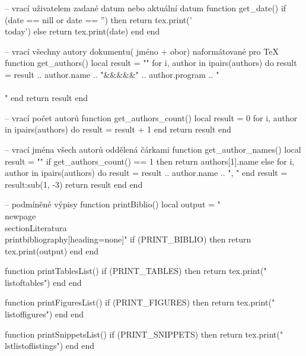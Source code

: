 \usepackage[
    a4paper,
    width=150mm,
    top=25mm,
    bottom=25mm
]{geometry}


\usepackage{fontspec}
\setmainfont{Linux Libertine O}


\usepackage[czech]{babel}


\usepackage{luacode}
\newcommand{\luavar}[1]{\directlua{tex.sprint(#1)}}
\begin{luacode*}
-- vrací uživatelem zadané datum nebo aktuální datum
function get_date()
  if (date == nill or date == '') then
    return tex.print('\\today')
  else
    return tex.print(date)
  end
end

-- vrací všechny autory dokumentu( jméno + obor) naformátované pro TeX
function get_authors()
  local result = ""
  for i, author in ipairs(authors) do
    result = result .. author.name .. "&&&&&" .. author.program .. "\\\\"
  end
  return result
end

-- vrací počet autorů
function get_authors_count()
    local result = 0
    for i, author in ipairs(authors) do
        result = result + 1
    end
    return result
end

-- vrací jména všech autorů oddělená čárkami
function get_author_names()
    local result = ""
    if get_authors_count() == 1 then
        return authors[1].name
    else
        for i, author in ipairs(authors) do
            result = result .. author.name .. ", "
        end
        result = result:sub(1, -3)
        return result
    end
end

-- podmíněné výpisy
function printBiblio()
  local output = "\\newpage \\section{Literatura} \\printbibliography[heading=none]"
  if (PRINT_BIBLIO) then
    return tex.print(output)
  end
end

function printTablesList()
    if (PRINT_TABLES) then
        return tex.print("\\listoftables")
    end
end

function printFiguresList()
    if (PRINT_FIGURES) then
        return tex.print("\\listoffigures")
    end
end

function printSnippetsList()
    if (PRINT_SNIPPETS) then
        return tex.print("\\lstlistoflistings")
    end
end
\end{luacode*}


